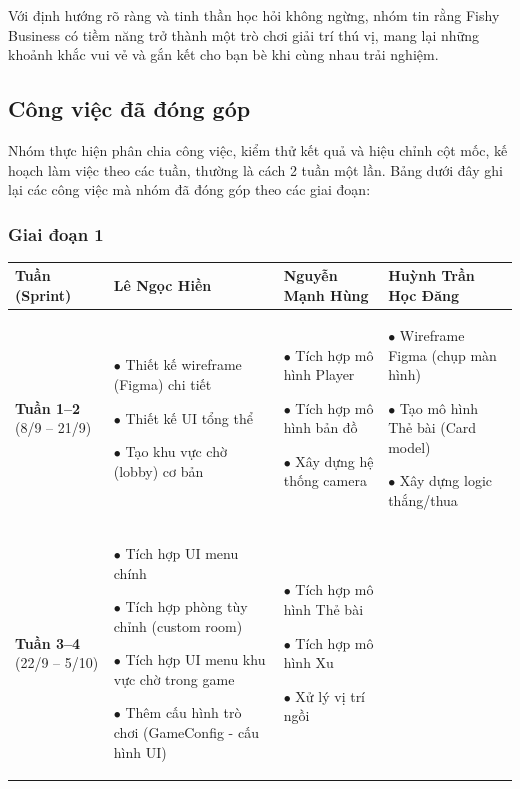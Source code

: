 Với định hướng rõ ràng và tinh thần học hỏi không ngừng, nhóm tin rằng Fishy Business có tiềm năng trở thành một trò chơi giải trí thú vị, mang lại những khoảnh khắc vui vẻ và gắn kết cho bạn bè khi cùng nhau trải nghiệm.

\subsection{Công việc đã đóng góp}
Nhóm thực hiện phân chia công việc, kiểm thử kết quả và hiệu chỉnh cột mốc, kế hoạch làm việc theo các tuần, thường là cách 2 tuần một lần. Bảng dưới đây ghi lại các công việc mà nhóm đã đóng góp theo các giai đoạn:
\subsubsection{Giai đoạn 1}
\begin{longtable}{|p{2cm}|p{4cm}|p{4cm}|p{4cm}|}
\hline
\textbf{Tuần (Sprint)} & \textbf{Lê Ngọc Hiền} & \textbf{Nguyễn Mạnh Hùng} & \textbf{Huỳnh Trần Học Đăng} \\
\hline

\textbf{Tuần 1--2} \newline (8/9 -- 21/9)
&
    $\bullet$ Thiết kế wireframe (Figma) chi tiết
    
    $\bullet$ Thiết kế UI tổng thể
    
    $\bullet$ Tạo khu vực chờ (lobby) cơ bản
&
    $\bullet$ Tích hợp mô hình Player
    
    $\bullet$ Tích hợp mô hình bản đồ
    
    $\bullet$ Xây dựng hệ thống camera
&
    $\bullet$ Wireframe Figma (chụp màn hình)
    
    $\bullet$ Tạo mô hình Thẻ bài (Card model)
    
    $\bullet$ Xây dựng logic thắng/thua
\\
\hline

\textbf{Tuần 3--4} \newline (22/9 -- 5/10)
&
    $\bullet$ Tích hợp UI menu chính
    
    $\bullet$ Tích hợp phòng tùy chỉnh (custom room)
    
    $\bullet$ Tích hợp UI menu khu vực chờ trong game
    
    $\bullet$ Thêm cấu hình trò chơi (GameConfig - cấu hình UI)
&
    $\bullet$ Tích hợp mô hình Thẻ bài
    
    $\bullet$ Tích hợp mô hình Xu
    
    $\bullet$ Xử lý vị trí ngồi
    

\end{longtable}

